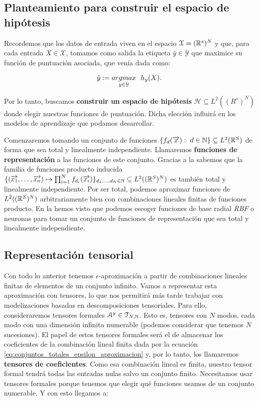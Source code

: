 \subsection{Planteamiento para construir el espacio de hipótesis} \label{sec:justificacion_func_repr}

Recordemos que los datos de entrada viven en el espacio $\mathcal{X} = (\mathbb{R}^s)^N$ y que, para cada entrada $X \in \mathcal{X}$, tomamos como salida la etiqueta $\hat{y} \in \mathcal{Y}$ que maximice su función de puntuación asociada, que venía dada como:

\begin{equation}
	\hat{y} := \underset{y \in \mathcal{Y}}{argmax} \ \  h_y(X).
\end{equation}

Por lo tanto, buscamos \textbf{construir un espacio de hipótesis} $\mathcal{H} \subseteq L^2((R^s)^N)$ donde elegir nuestras funciones de puntuación. Dicha elección influirá en los modelos de aprendizaje que podamos desarrollar.

Comenzaremos tomando un conjunto de funciones $\{ f_d(\overrightarrow{x}): \; d \in \mathbb{N} \} \subseteq L^2(\mathbb{R}^S)$ de forma que sea total y linealmente independiente. Llamaremos \textbf{funciones de representación} a las funciones de este conjunto. Gracias a la  sabemos que la familia de funciones producto inducida $\{ (\overrightarrow{x_1}, \ldots, \overrightarrow{x_n}) \mapsto \prod_{i = 1}^N f_{d_i}(\overrightarrow{x_i})  \}_{d_1, \ldots, d_N \in \mathbb{N}} \subseteq L^2((\mathbb{R}^S)^N)$ es también total y linealmente independiente. Por ser total, podemos aproximar funciones de $L^2((\mathbb{R}^S)^N)$ arbitrariamente bien con combinaciones lineales finitas de funciones producto. En la  hemos visto que podemos escoger funciones de base radial \textit{RBF} o neuronas para tomar un conjunto de funciones de representación que sea total y linealmente independiente.

\subsection{Representación tensorial}

Con todo lo anterior tenemos $\epsilon$-aproximación a partir de combinaciones lineales finitas de elementos de un conjunto infinito. Vamos a representar esta aproximación con tensores, lo que nos permitirá más tarde trabajar con modelizaciones basadas en descomposiciones tensoriales. Para ello, consideraremos tensores formales $\mathcal{A}^y \in \mathcal{T}_{N, \mathbb{N}}$. Esto es, tensores con $N$ modos, cada modo con una dimensión infinita numerable (podemos considerar que tenemos $N$ sucesiones). El papel de estos tensores formales será el de almacenar los coeficientes de la combinación lineal finita dada por la ecuación \eqref{eq:conjuntos_totales_epsilon_aproximacion} y, por lo tanto, los llamaremos \textbf{tensores de coeficientes}. Como esa combinación lineal es finita, nuestro tensor formal tendrá todas las entradas nulas salvo un conjunto finito. Necesitamos usar tensores formales porque tenemos que elegir qué funciones usamos de un conjunto numerable. Y con esto llegamos a:

